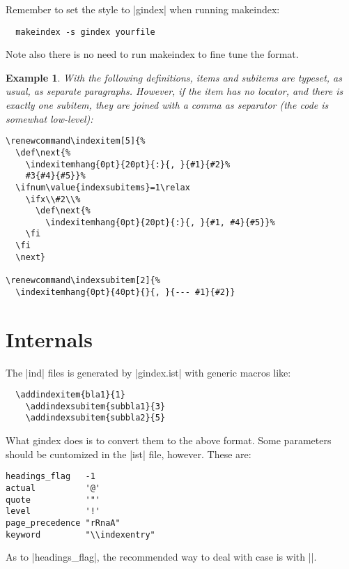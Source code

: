 \documentclass[a4paper]{ltxguide}
\newtheorem{example}{Example}
\begin{document}
Remember to set the style to |gindex| when running \textsf{makeindex}:
\begin{verbatim}
  makeindex -s gindex yourfile
\end{verbatim}

Note also there is no need to run \textsf{makeindex} to fine tune the
format.

\begin{example}
 With the following definitions, items and subitems are typeset, as
 usual, as separate paragraphs. However, if the item has no locator,
 and there is exactly one subitem, they are joined with a comma as
 separator (the code is somewhat low-level):
\begin{verbatim}
\renewcommand\indexitem[5]{%
  \def\next{%
    \indexitemhang{0pt}{20pt}{:}{, }{#1}{#2}%
    #3{#4}{#5}}%
  \ifnum\value{indexsubitems}=1\relax
    \ifx\\#2\\%
      \def\next{%
        \indexitemhang{0pt}{20pt}{:}{, }{#1, #4}{#5}}%
    \fi
  \fi
  \next}

\renewcommand\indexsubitem[2]{%
  \indexitemhang{0pt}{40pt}{}{, }{--- #1}{#2}}
\end{verbatim}
  
\end{example}

\section{Internals}

The |ind| files is generated by |gindex.ist| with generic macros like:
\begin{verbatim}
  \addindexitem{bla1}{1}
    \addindexsubitem{subbla1}{3}
    \addindexsubitem{subbla2}{5}
\end{verbatim}
What \textsf{gindex} does is to convert them to the above format. Some
parameters should be cuntomized in the |ist| file, however. These are:
\begin{verbatim}
headings_flag   -1
actual          '@'
quote           '"'
level           '!'
page_precedence "rRnaA"
keyword         "\\indexentry"
\end{verbatim}
As to |headings_flag|, the recommended way to deal with case is with
|\indexheading|.
\end{document}
